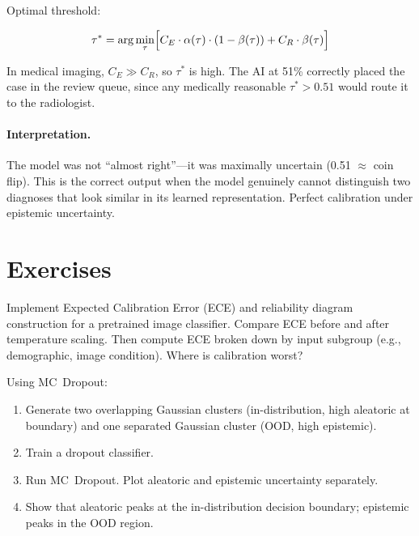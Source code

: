 Optimal threshold:

\[
\tau^* = \arg\min_\tau \Bigl[ C_E \cdot \alpha(\tau) \cdot (1 - \beta(\tau)) + C_R \cdot \beta(\tau) \Bigr]
\]

In medical imaging, $C_E \gg C_R$, so $\tau^*$ is high. The AI at 51\% correctly placed the case in the review queue, since any medically reasonable $\tau^* > 0.51$ would route it to the radiologist.

\paragraph{Interpretation.} The model was not ``almost right''---it was maximally uncertain (0.51 $\approx$ coin flip). This is the correct output when the model genuinely cannot distinguish two diagnoses that look similar in its learned representation. Perfect calibration under epistemic uncertainty.

\section{Exercises}

\begin{Exercise}
Implement Expected Calibration Error (ECE) and reliability diagram construction for a pretrained image classifier. Compare ECE before and after temperature scaling. Then compute ECE broken down by input subgroup (e.g., demographic, image condition). Where is calibration worst?
\end{Exercise}

\begin{Exercise}
Using MC~Dropout:
\begin{enumerate}
    \item Generate two overlapping Gaussian clusters (in-distribution, high aleatoric at boundary) and one separated Gaussian cluster (OOD, high epistemic).
    \item Train a dropout classifier.
    \item Run MC~Dropout. Plot aleatoric and epistemic uncertainty separately.
    \item Show that aleatoric peaks at the in-distribution decision boundary; epistemic peaks in the OOD region.
\end{enumerate}
\end{Exercise}

